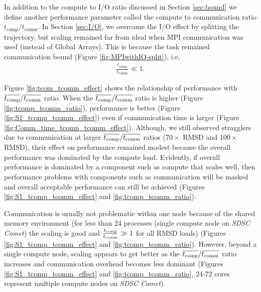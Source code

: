 \label{sec:tcomm}
In addition to the compute to I/O ratio discussed in Section \ref{sec:bound} we define another performance parameter called the compute to communication ratio $t_{\text{comp}}/t_{\text{comm}}$.
In Section \ref{sec:I/O}, we overcame the I/O effect by splitting the trajectory, but scaling remained far from ideal when MPI communication was used (instead of  Global Arrays).
This is because the task remained communication bound (Figure \ref{fig:MPIwithIO-split}), i.e, 
\begin{gather*}
  \frac{t_{\text{comp}}}{t_{\text{comm}}} \ll 1.
\end{gather*}

Figure \ref{fig:tcom_tcomm_effect} shows the relationship of performance with $\overline{{t}_{\text{comp}}}/\overline{t_{\text{comm}}}$ ratio.
When the $\overline{{t}_{\text{comp}}}/\overline{t_{\text{comm}}}$ ratio is higher (Figure \ref{fig:tcomp_tcomm_ratio}), performance is better (Figure \ref{fig:S1_tcomp_tcomm_effect}) even if communication time is larger (Figure \ref{fig:Comm_time_tcomp_tcomm_effect}).
Although, we still observed stragglers due to communication at larger $\overline{{t}_{\text{comp}}}/\overline{t_{\text{comm}}}$ ratios ($70\times$ RMSD and $100\times$ RMSD), their effect on performance remained modest because the overall performance was dominated by the compute load. 
Evidently, if overall performance is dominated by a component such as compute that scales well, then performance problems with components such as communication will be masked and overall acceptable performance can still be achieved (Figures \ref{fig:S1_tcomp_tcomm_effect} and \ref{fig:tcomp_tcomm_ratio}).

Communication is usually not problematic within one node because of the shared memory environment (for less than 24 processes (single compute node on \emph{SDSC Comet}) the scaling is good and $\frac{{t}_{\text{comp}}}{t_{\text{comm}}} \gg 1$ for all RMSD loads) (Figures \ref{fig:S1_tcomp_tcomm_effect} and \ref{fig:tcomp_tcomm_ratio}).
However, beyond a single compute node, scaling appears to get better as the $\overline{{t}_{\text{comp}}}/\overline{t_{\text{comm}}}$ ratio increases and communication overhead becomes less dominant (Figures \ref{fig:S1_tcomp_tcomm_effect} and \ref{fig:tcomp_tcomm_ratio}, 24-72 cores represent multiple compute nodes on \emph{SDSC Comet}).

